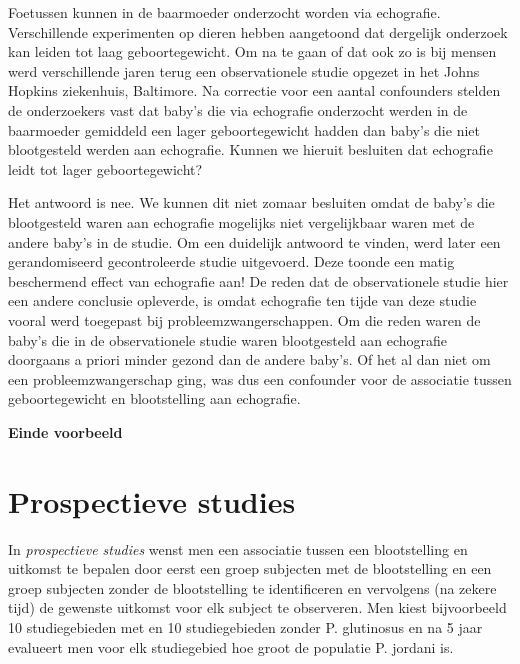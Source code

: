 \documentclass[
  dutch,
  letterpaper,
  12pt]{book}
\theoremstyle{definition}
\theoremstyle{definition}
\theoremstyle{definition}
\theoremstyle{remark}
\begin{document}
Foetussen kunnen in de baarmoeder onderzocht worden via echografie.
Verschillende experimenten op dieren hebben aangetoond dat dergelijk
onderzoek kan leiden tot laag geboortegewicht. Om na te gaan of dat ook
zo is bij mensen werd verschillende jaren terug een observationele
studie opgezet in het Johns Hopkins ziekenhuis, Baltimore. Na correctie
voor een aantal confounders stelden de onderzoekers vast dat baby's die
via echografie onderzocht werden in de baarmoeder gemiddeld een lager
geboortegewicht hadden dan baby's die niet blootgesteld werden aan
echografie. Kunnen we hieruit besluiten dat echografie leidt tot lager
geboortegewicht?

Het antwoord is nee. We kunnen dit niet zomaar besluiten omdat de baby's
die blootgesteld waren aan echografie mogelijks niet vergelijkbaar waren
met de andere baby's in de studie. Om een duidelijk antwoord te vinden,
werd later een gerandomiseerd gecontroleerde studie uitgevoerd. Deze
toonde een matig beschermend effect van echografie aan! De reden dat de
observationele studie hier een andere conclusie opleverde, is omdat
echografie ten tijde van deze studie vooral werd toegepast bij
probleemzwangerschappen. Om die reden waren de baby's die in de
observationele studie waren blootgesteld aan echografie doorgaans a
priori minder gezond dan de andere baby's. Of het al dan niet om een
probleemzwangerschap ging, was dus een confounder voor de associatie
tussen geboortegewicht en blootstelling aan echografie.

\textbf{Einde voorbeeld}

\section{Prospectieve studies}\label{sec-design-prosp}

In \emph{prospectieve studies} wenst men een associatie tussen een
blootstelling en uitkomst te bepalen door eerst een groep subjecten met
de blootstelling en een groep subjecten zonder de blootstelling te
identificeren en vervolgens (na zekere tijd) de gewenste uitkomst voor
elk subject te observeren. Men kiest bijvoorbeeld 10 studiegebieden met
en 10 studiegebieden zonder P. glutinosus en na 5 jaar evalueert men
voor elk studiegebied hoe groot de populatie P. jordani is.
\end{document}
